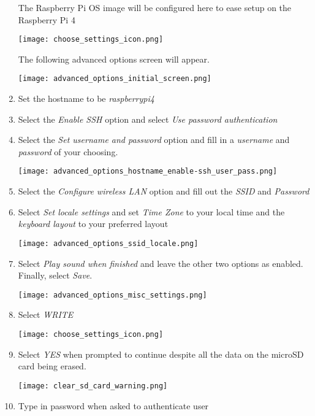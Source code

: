 \documentclass[journal]{IEEEtran}
\begin{document}
\begin{enumerate}
        The Raspberry Pi OS image will be configured here to ease setup on the Raspberry Pi 4

        \texttt{[image: choose\_settings\_icon.png]}

        The following advanced options screen will appear. \newline

        \texttt{[image: advanced\_options\_initial\_screen.png]}

        \item Set the hostname to be \emph{raspberrypi4}
        \item Select the \emph{Enable SSH} option and select \emph{Use password authentication}
        \item Select the \emph{Set username and password} option and fill in a \emph{username} and \emph{password} of your choosing.
        
        \texttt{[image: advanced\_options\_hostname\_enable-ssh\_user\_pass.png]}

        \item Select the \emph{Configure wireless LAN} option and fill out the \emph{SSID} and \emph{Password}
        
        \item Select \emph{Set locale settings} and set \emph{Time Zone} to your local time and the \emph{keyboard layout} to your preferred layout
        
        \texttt{[image: advanced\_options\_ssid\_locale.png]}

        \item Select \emph{Play sound when finished} and leave the other two options as enabled. Finally, select \emph{Save}.
        
        \texttt{[image: advanced\_options\_misc\_settings.png]}

        \item Select \emph{WRITE} 
        
        \texttt{[image: choose\_settings\_icon.png]}

        \item Select \emph{YES} when prompted to continue despite all the data on the microSD card being erased.
        
        \texttt{[image: clear\_sd\_card\_warning.png]}

        \item Type in password when asked to authenticate user
        

\end{enumerate}
\end{document}
